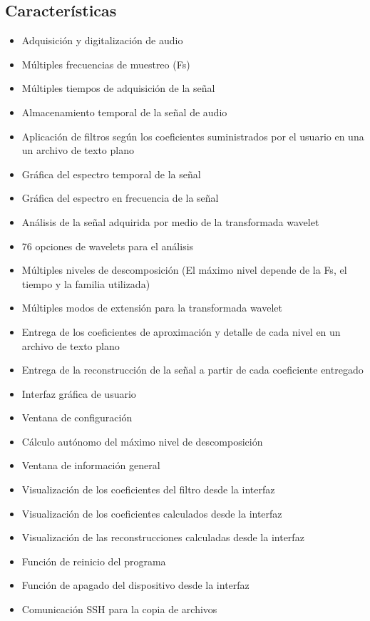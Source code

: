 \documentclass[11pt,lettersize]{article} %
\begin{document}
\subsection{Características}
\begin{itemize}[nolistsep]
	\item Adquisición y digitalización de audio
	\item Múltiples frecuencias de muestreo (Fs)
	\item Múltiples tiempos de adquisición de la señal
	\item Almacenamiento temporal de la señal de audio
	\item Aplicación de filtros según los coeficientes suministrados por el usuario en una un archivo de texto plano
	\item Gráfica del espectro temporal de la señal
	\item Gráfica del espectro en frecuencia de la señal
	\item Análisis de la señal adquirida por medio de la transformada wavelet
	\item 76 opciones de wavelets para el análisis %
	\item Múltiples niveles de descomposición (El máximo nivel depende de la Fs, el tiempo y la familia utilizada)
	\item Múltiples modos de extensión para la transformada wavelet %
	\item Entrega de los coeficientes de aproximación y detalle de cada nivel en un archivo de texto plano
	\item Entrega de la reconstrucción de la señal a partir de cada coeficiente entregado
	\item Interfaz gráfica de usuario
	\item Ventana de configuración
	\item Cálculo autónomo del máximo nivel de descomposición
	\item Ventana de información general
	\item Visualización de los coeficientes del filtro desde la interfaz
	\item Visualización de los coeficientes calculados desde la interfaz
	\item Visualización de las reconstrucciones calculadas desde la interfaz
	\item Función de reinicio del programa
	\item Función de apagado del dispositivo desde la interfaz
	\item Comunicación SSH para la copia de archivos
\end{itemize}
\end{document}
